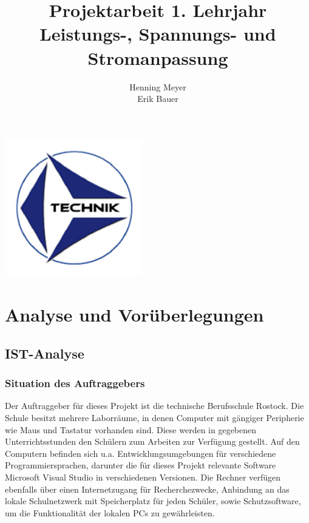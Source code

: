 \documentclass[a4paper]{article}
\title{Projektarbeit 1. Lehrjahr\\Leistungs-, Spannungs- und Stromanpassung}
\author{Henning Meyer\\Erik Bauer}
\begin{document}

\maketitle
\begin{center}
    \includegraphics[width=6cm]{img/logo}
\end{center}
\newpage
\tableofcontents
\newpage


\fontsize{11}{14}
\selectfont

\section{Analyse und Vorüberlegungen}

\subsection{IST-Analyse}

\subsubsection{Situation des Auftraggebers}

    Der Auftraggeber für dieses Projekt ist die technische Berufsschule Rostock.
    Die Schule besitzt mehrere Laborräume, in denen Computer mit gängiger Peripherie wie Maus und Tastatur vorhanden sind.
    Diese werden in gegebenen Unterrichtsstunden den Schülern zum Arbeiten zur Verfügung gestellt.
    Auf den Computern befinden sich u.a. Entwicklungsumgebungen für verschiedene Programmiersprachen, darunter die für dieses Projekt relevante Software \glqq Microsoft Visual Studio\grqq{} in verschiedenen Versionen.
    Die Rechner verfügen ebenfalls über einen Internetzugang für Recherchezwecke, Anbindung an das lokale Schulnetzwerk mit Speicherplatz für jeden Schüler, sowie Schutzsoftware, um die Funktionalität der lokalen PCs zu gewährleisten.
\end{document}
